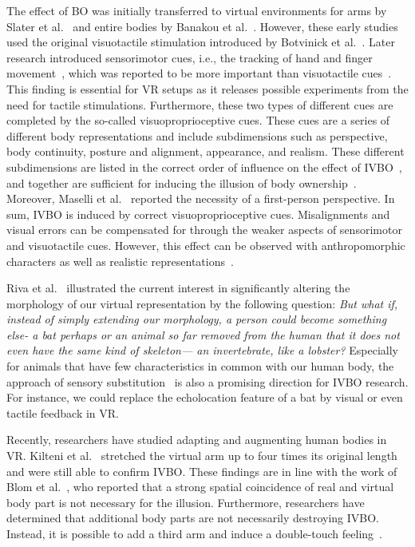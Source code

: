 \documentclass[conference]{IEEEtran}
\begin{document}
The effect of BO was initially transferred to virtual environments for arms by Slater et al.~\cite{slater2008towards} and entire bodies by Banakou et al.~\cite{banakou2013illusory}. However, these early studies used the original visuotactile stimulation introduced by Botvinick et al.~\cite{botvinick1998rubber}. Later research introduced sensorimotor cues, i.e., the tracking of hand and finger movement~\cite{sanchez2010virtual}, which was reported to be more important than visuotactile cues~\cite{slater2010first}. This finding is essential for VR setups as it releases possible experiments from the need for tactile stimulations. Furthermore, these two types of different cues are completed by the so-called visuoproprioceptive cues. These cues are a series of different body representations and include subdimensions such as perspective, body continuity, posture and alignment, appearance, and realism. These different subdimensions are listed in the correct order of influence on the effect of IVBO~\cite{slater2009inducing,slater2010first,perez2012my,maselli2013building}, and together are sufficient for inducing the illusion of body ownership~\cite{maselli2013building}. Moreover, Maselli et al.~\cite{maselli2013building} reported the necessity of a first-person perspective. In sum, IVBO is induced by correct visuoproprioceptive cues. Misalignments and visual errors can be compensated for through the weaker aspects of sensorimotor and visuotactile cues. However, this effect can be observed with anthropomorphic characters as well as realistic representations~\cite{lugrin2015anthropomorphism, lin2016need,jo2017impact}.


Riva et al.~\cite{riva2014interacting} illustrated the current interest in significantly altering the morphology of our virtual representation by the following question: \textit{But what if, instead of simply extending our morphology, a person could become something else- a bat perhaps or an animal so far removed from the human that it does not even have the same kind of skeleton— an invertebrate, like a lobster?} Especially for animals that have few characteristics in common with our human body, the approach of sensory substitution~\cite{bach2003sensory} is also a promising direction for IVBO research. For instance, we could replace the echolocation feature of a bat by visual or even tactile feedback in VR.

Recently, researchers have studied adapting and augmenting human bodies in VR. Kilteni et al.~\cite{kilteni2012extending} stretched the virtual arm up to four times its original length and were still able to confirm IVBO. These findings are in line with the work of Blom et al.~\cite{blom2014effects}, who reported that a strong spatial coincidence of real and virtual body part is not necessary for the illusion. Furthermore, researchers have determined that additional body parts are not necessarily destroying IVBO. Instead, it is possible to add a third arm and induce a double-touch feeling~\cite{ehrsson2009many,guterstam2011illusion}. 
\end{document}

